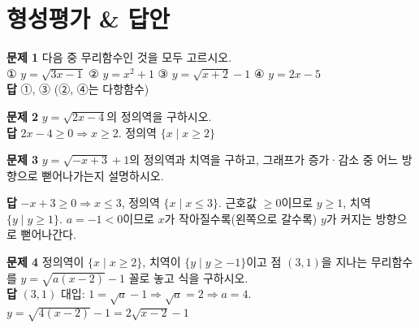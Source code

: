 \documentclass[11pt,a4paper]{article}
\begin{document}
\section{형성평가 \& 답안}
\begin{minipage}[t]{0.48\linewidth}
\begin{answerbox}
\textbf{문제 1} \quad 다음 중 무리함수인 것을 모두 고르시오.\\
\small ① $y=\sqrt{3x-1}$ \; ② $y=x^2+1$ \; ③ $y=\sqrt{x+2}-1$ \; ④ $y=2x-5$\\[4pt]
\textbf{\color{goldstrong}답} \; ①, ③ (②, ④는 다항함수)
\end{answerbox}
\end{minipage}\hfill
\begin{minipage}[t]{0.48\linewidth}
\begin{answerbox}
\textbf{문제 2} \quad $y=\sqrt{2x-4}$의 정의역을 구하시오.\\[4pt]
\textbf{\color{goldstrong}답} \; $2x-4\geq0 \Rightarrow x\geq2$. 정의역 $\{x\mid x\geq2\}$
\end{answerbox}
\end{minipage}

\vspace{6pt}
\begin{answerbox}
\textbf{문제 3} \quad $y=\sqrt{-x+3}+1$의 정의역과 치역을 구하고, 그래프가 증가·감소 중 어느 방향으로 뻗어나가는지 설명하시오.

\vspace{4pt}
\centering
{}

\vspace{4pt}
\raggedright\textbf{\color{goldstrong}답} \; $-x+3\geq0 \Rightarrow x\leq3$, 정의역 $\{x\mid x\leq3\}$. 근호값 $\geq0$이므로 $y\geq1$, 치역 $\{y\mid y\geq1\}$. $a=-1<0$이므로 $x$가 작아질수록(왼쪽으로 갈수록) $y$가 커지는 방향으로 뻗어나간다.
\end{answerbox}

\vspace{6pt}
\begin{answerbox}
\textbf{문제 4} \quad 정의역이 $\{x\mid x\geq2\}$, 치역이 $\{y\mid y\geq-1\}$이고 점 $(3,1)$을 지나는 무리함수를 $y=\sqrt{a(x-2)}-1$ 꼴로 놓고 식을 구하시오.\\[4pt]
\textbf{\color{goldstrong}답} \; $(3,1)$ 대입: $1=\sqrt{a}-1 \Rightarrow \sqrt a=2 \Rightarrow a=4$. \; $y=\sqrt{4(x-2)}-1=2\sqrt{x-2}-1$
\end{answerbox}
\end{document}
